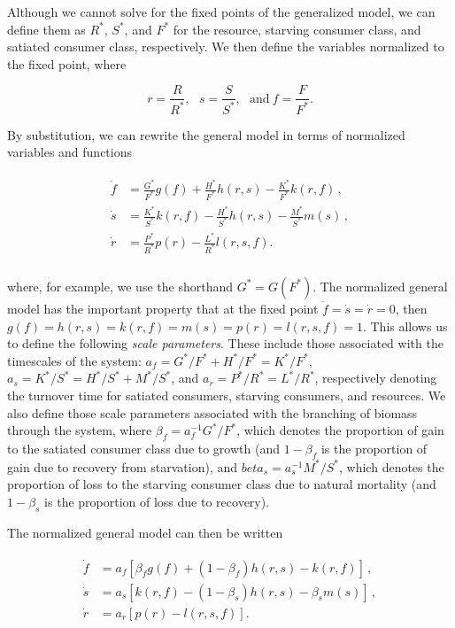 \documentclass[11pt]{article}
\begin{document}
\noindent Although we cannot solve for the fixed points of the generalized model, we can define them as $R^*$, $S^*$, and $F^*$ for the resource, starving consumer class, and satiated consumer class, respectively.
We then define the variables normalized to the fixed point, where

\begin{equation}
r = \frac{R}{R^*},~~~ s = \frac{S}{S^*},~~~\mbox{and}~f = \frac{F}{F^*}.
\end{equation}

By substitution, we can rewrite the general model in terms of normalized variables and functions

\begin{align}
  \label{GNE}
\begin{split}
\dot f &= \frac{G^*}{F^*}g(f) + \frac{H^*}{F^*}h(r,s) - \frac{K^*}{F^*}k(r,f)\,,\\
\dot s &= \frac{K^*}{S^*}k(r,f) - \frac{H^*}{S^*}h(r,s) - \frac{M^*}{S^*}m(s)\,, \\
\dot r &= \frac{P^*}{R^*}p(r) - \frac{L^*}{R^*}l(r,s,f).\\
\end{split}
\end{align}


\noindent where, for example, we use the shorthand $G^* = G(F^*)$.
The normalized general model has the important property that at the fixed point $\dot f = \dot s = \dot r = 0$, then $g(f) = h(r,s) = k(r,f) = m(s) = p(r) = l(r,s,f) = 1$.
This allows us to define the following \emph{scale parameters}. These include those associated with the timescales of the system: $a_f = G^*/F^* + H^*/F^* = K^*/F^*$, $a_s = K^*/S^* = H^*/S^* + M^*/S^*$, and $a_r = P^*/R^* = L^*/R^*$, respectively denoting the turnover time for satiated consumers, starving consumers, and resources.
We also define those scale parameters associated with the branching of biomass through the system, where
$\beta_f = a_f^{-1}G^*/F^*$, which denotes the proportion of gain to the satiated consumer class due to growth (and $1-\beta_f$ is the proportion of gain due to recovery from starvation), and
$beta_s = a_s^{-1}M^*/S^*$, which denotes the proportion of loss to the starving consumer class due to natural mortality (and $1-\beta_s$ is the proportion of loss due to recovery).

The normalized general model can then be written

\begin{align}
  \label{GNE}
\begin{split}
\dot f &= a_f\left[ \beta_f g(f) + (1-\beta_f) h(r,s) - k(r,f)\right]\,,\\
\dot s &= a_s\left[ k(r,f) - (1-\beta_s)h(r,s) - \beta_sm(s)\right]\,, \\
\dot r &= a_r\left[p(r) - l(r,s,f)\right].\\
\end{split}
\end{align}
\end{document}
